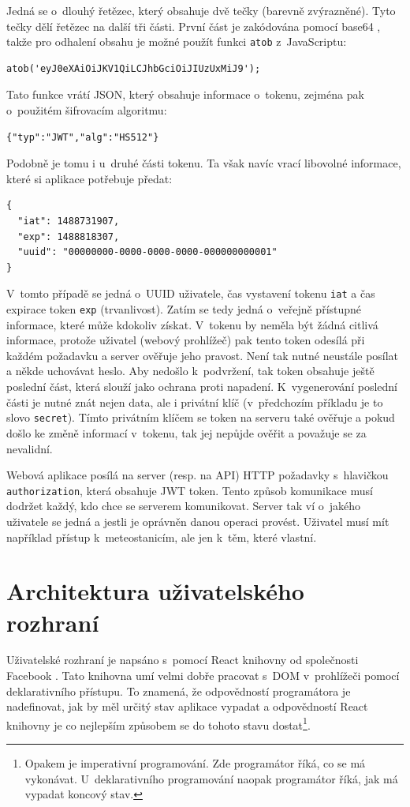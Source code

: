 Jedná se o~dlouhý řetězec, který obsahuje dvě tečky (barevně zvýrazněné). Tyto tečky dělí řetězec na další tři části. První část je zakódována pomocí base64 \cite{base64}, takže pro odhalení obsahu je možné použít funkci \texttt{atob} z~JavaScriptu:
%
\begin{verbatim}
atob('eyJ0eXAiOiJKV1QiLCJhbGciOiJIUzUxMiJ9');
\end{verbatim}
%
Tato funkce vrátí JSON, který obsahuje informace o~tokenu, zejména pak o~použitém šifrovacím algoritmu:
%
\begin{verbatim}
{"typ":"JWT","alg":"HS512"}
\end{verbatim}
%
Podobně je tomu i u~druhé části tokenu. Ta však navíc vrací libovolné informace, které si aplikace potřebuje předat:
%
\begin{verbatim}
{
  "iat": 1488731907,
  "exp": 1488818307,
  "uuid": "00000000-0000-0000-0000-000000000001"
}
\end{verbatim}

V~tomto případě se jedná o~UUID uživatele, čas vystavení tokenu \texttt{iat} a čas expirace token \texttt{exp} (trvanlivost). Zatím se tedy jedná o~veřejně přístupné informace, které může kdokoliv získat. V~tokenu by neměla být žádná citlivá informace, protože uživatel (webový prohlížeč) pak tento token odesílá při každém požadavku a server ověřuje jeho pravost. Není tak nutné neustále posílat a někde uchovávat heslo. Aby nedošlo k~podvržení, tak token obsahuje ještě poslední část, která slouží jako ochrana proti napadení. K~vygenerování poslední části je nutné znát nejen data, ale i privátní klíč (v~předchozím příkladu je to slovo \texttt{secret}). Tímto privátním klíčem se token na serveru také ověřuje a pokud došlo ke změně informací v~tokenu, tak jej nepůjde ověřit a považuje se za nevalidní.

Webová aplikace posílá na server (resp. na API) HTTP požadavky s~hla\-vič\-kou \texttt{authorization}, která obsahuje JWT token. Tento způsob komunikace musí dodržet každý, kdo chce se serverem komunikovat. Server tak ví o~jakého uživatele se jedná a jestli je oprávněn danou operaci provést. Uživatel musí mít například přístup k~meteostanicím, ale jen k~těm, které vlastní.


\section{Architektura uživatelského rozhraní}
Uživatelské rozhraní je napsáno s~pomocí React knihovny od společnosti Facebook \cite{reactjs}. Tato knihovna umí velmi dobře pracovat s~DOM v~prohlížeči pomocí deklarativního přístupu. To znamená, že odpovědností programátora je nadefinovat, jak by měl určitý stav aplikace vypadat a odpovědností React knihovny je co nejlepším způsobem se do tohoto stavu dostat\footnote{Opakem je imperativní programování. Zde programátor říká, co se má vykonávat. U~deklarativního programování naopak programátor říká, jak má vypadat koncový stav.}.

